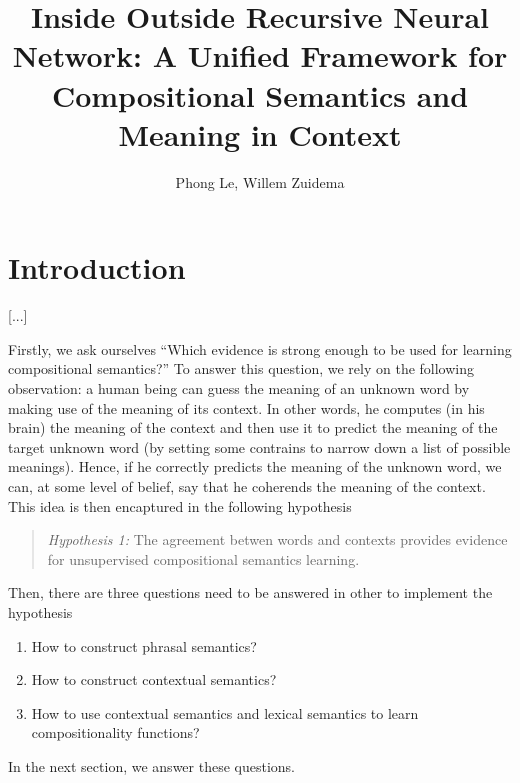 \documentclass[11pt]{article}
\title{Inside Outside Recursive Neural Network: A Unified Framework for 
Compositional Semantics and Meaning in Context}
\author{Phong Le, Willem Zuidema}
\begin{document}
\maketitle


\section{Introduction}
\label{section introduction}

[...]

Firstly, we ask ourselves ``Which evidence is strong enough to be used for 
learning compositional semantics?'' To answer this question, we rely on the 
following observation: a human being can guess the meaning of an unknown 
word by making use of the meaning of its context. In other words, he computes 
(in his brain) the meaning of the context and then use it to predict the meaning 
of the target unknown word (by setting some contrains to narrow down a list of 
possible meanings). Hence, if he correctly predicts the meaning of the unknown word, 
we can, at some level of belief, say that he coherends the meaning of the context. 
This idea is then encaptured in the following hypothesis
\begin{quote}
\textit{Hypothesis 1:} The agreement betwen words and contexts provides evidence for unsupervised 
compositional semantics learning. 
\end{quote}

Then, there are three questions need to be answered in other to implement the 
hypothesis
\begin{enumerate}
	\item How to construct phrasal semantics?
	\item How to construct contextual semantics?
	\item How to use contextual semantics and lexical semantics to learn 
	compositionality functions?
\end{enumerate}
In the next section, we answer these questions.

\end{document}
